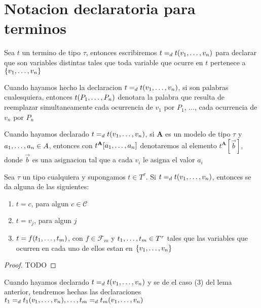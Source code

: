 

\section{Notacion declaratoria para terminos}
\begin{definition}
  Sea $t$ un termino de tipo $\tau$, entonces escribiremos $t =_d t(v_{1}, \dots, v_{n})$
  para declarar que  son variables distintas tales que toda variable que ocurre en 
  $t$ pertenece a $\{v_{1}, \dots, v_{n}\}$
\end{definition}

\begin{convention}
  Cuando hayamos hecho la declaracion $t =_d t(v_{1}, \dots, v_{n})$, si 
  son palabras cualesquiera, entonces $t(P_{1}, \dots, P_{n})$ denotara la palabra que resulta de reemplazar
  simultaneamente cada ocurrencia de $v_1$ por $P_1$, $\dots$, cada ocurrencia de $v_n$ por $P_n$
\end{convention}
\begin{convention}
  Cuando hayamos declarado $t =_d t(v_{1}, \dots, v_{n})$, si $\mathbf{A}$ es un modelo de 
  tipo $\tau$ y $a_{1}, \dots, a_{n} \in A$, entonces con $t^\mathbf{A}[a_{1}, \dots, a_{n}]$
  denotaremos al elemento $t^\mathbf{A}[\vec{b}]$, donde $\vec{b}$ es una asignacion tal que a cada
  $v_i$ le asigna el valor $a_i$
\end{convention}

\begin{lemma}
  Sea $\tau$ un tipo cualquiera y supongamos $t \in T^\tau$. Si $t =_d t(v_{1}, \dots, v_{n})$,
  entonces se da alguna de las siguientes: \begin{enumerate}
    \item $t = c$, para algun $c \in \mathcal{C}$
    \item $t = v_j$, para algun $j$
    \item $t = f(t_{1}, \dots, t_{m})$, con $f \in \mathcal{F}_m$ y $t_{1}, \dots, t_{m} \in T^\tau$ tales
    que las variables que ocurren en cada uno de ellos estan en $\{v_{1}, \dots, v_{n}\}$
  \end{enumerate}
\end{lemma}
\begin{proof}
  TODO
\end{proof}

\begin{convention}
  Cuando hayamos declarado $t =_d t(v_{1}, \dots, v_{n})$ y se de el caso (3) del lema anterior,
  tendremos hechas las declaraciones $t_1 =_d t_1(v_{1}, \dots, v_{n}), \dots, t_m =_d t_m(v_{1}, \dots, v_{n})$
\end{convention}

